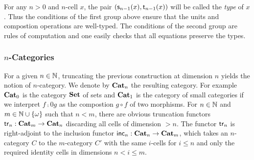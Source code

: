 \begin{remark}
  For any $n>0$ and $n$-cell $x$, the pair $(\mathsf{s}_{n-1}(x),\mathsf{t}_{n-1}(x))$ will be called the {\em type} of $x$. Thus the conditions of the first group above ensure that the units and compostion operations are well-typed. The conditions of the second group are rules of computation and one easily checks that all equations preserve the types. 
\end{remark}
\subsubsection{$n$-Categories}\label{ssubsec:ncat}
For a given $n\in\mathbb N$, truncating the previous construction at dimension $n$ yields the notion of $n$-category.  We denote by $\mathbf{Cat}_{n}$ the resulting category. For example $\mathbf{Cat}_{0}$ is the category $\mathbf{Set}$ of sets and $\mathbf{Cat}_{1}$ is the category of small categories if we interpret $f\comp 0 g$ as the compostion $g\circ f$ of two morphisms.
For $n\in\mathbb N$ and $m\in\mathbb N\cup \left\{\omega\right\}$ such that $n<m$, there are 
obvious truncation functors $\mathsf{tr}_{n}:\mathbf{Cat}_{m}\to \mathbf{Cat}_{n}$ discarding all cells of dimension $>n$. The functor $\mathsf{tr}_{n}$ is right-adjoint to the inclusion functor  $\mathsf{inc}_{n}:\mathbf{Cat}_{n}\to\mathbf{Cat}_{m}$, which takes an $n$-category $C$ to the $m$-category $C'$ with the same $i$-cells for $i\leq n$ and only the required identity cells in dimensions $n<i\leq m$.


